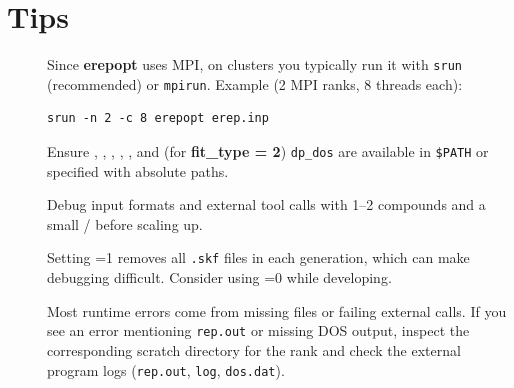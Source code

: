 \section{Tips}

\begin{description}
\item[] Since \textbf{erepopt} uses MPI, on clusters you typically run it with
\texttt{srun} (recommended) or \texttt{mpirun}. Example (2 MPI ranks, 8 threads each):
{\scriptsize
\begin{verbatim}
srun -n 2 -c 8 erepopt erep.inp
\end{verbatim}}

\item[] Ensure , , , , ,
and (for \textbf{fit\_type = 2}) \texttt{dp\_dos} are available in \texttt{\$PATH} or specified with absolute paths.

\item[] Debug input formats and external tool calls with 1--2 compounds and a small
/ before scaling up.

\item[] Setting =1 removes all \texttt{.skf} files in  each generation,
which can make debugging difficult. Consider using =0 while developing.

\item[] Most runtime errors come from missing files or failing external calls.
If you see an error mentioning \texttt{rep.out} or missing DOS output, inspect the corresponding scratch directory
for the rank and check the external program logs (\texttt{rep.out}, \texttt{log}, \texttt{dos.dat}).
\end{description}


